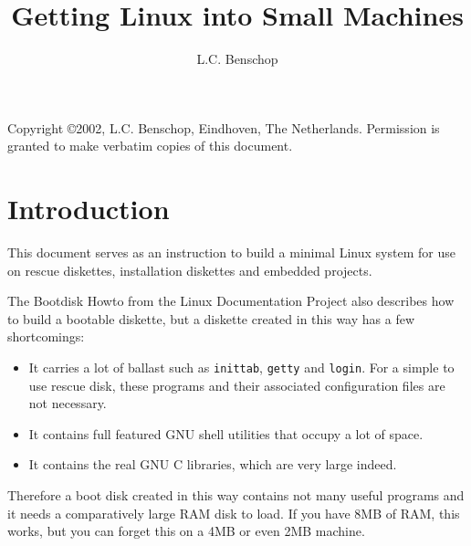 \documentclass[12pt,a4paper]{article}
\title{Getting Linux into Small Machines}
\author{L.C. Benschop}
\begin{document}
\maketitle

Copyright \copyright{}2002, L.C. Benschop, Eindhoven, The
Netherlands. Permission is granted to make verbatim copies of this
document.

\tableofcontents

\section{Introduction}

This document serves as an instruction to build a minimal Linux system
for use on rescue diskettes, installation diskettes and embedded
projects. 

The Bootdisk Howto from the Linux Documentation Project also describes
how to build a bootable diskette, but a diskette created in this way
has a few shortcomings:
\begin{itemize}
\item It carries a lot of ballast such as {\tt inittab}, {\tt getty} and
  {\tt login}. For a simple to use rescue disk, these programs and their
  associated configuration files are not necessary.
\item It contains full featured GNU shell utilities that occupy a lot
  of space.
\item It contains the real GNU C libraries, which are very large indeed.
\end{itemize}
Therefore a boot disk created in this way contains not many useful
programs and it needs a comparatively large RAM disk to load. If you
have 8MB of RAM, this works, but you can forget this on a 4MB or even
2MB machine. 
\end{document}
